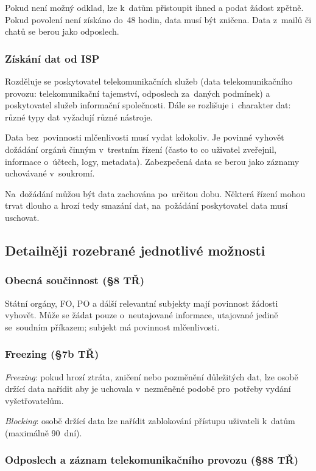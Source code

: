 Pokud není možný odklad, lze k~datům přistoupit ihned a podat žádost zpětně.
Pokud povolení není získáno do~48 hodin, data musí být zničena.
Data z~mailů či chatů se berou jako odposlech.


\subsubsection{Získání dat od ISP}

Rozděluje se poskytovatel telekomunikačních služeb (data telekomunikačního provozu: telekomunikační tajemství, odposlech za~daných podmínek) a poskytovatel služeb informační společnosti.
Dále se rozlišuje i~charakter dat: různé typy dat vyžadují různé nástroje.

Data bez~povinnosti mlčenlivosti musí vydat kdokoliv.
Je povinné vyhovět dožádání orgánů činným v~trestním řízení (často to co uživatel zveřejnil, informace o~účtech, logy, metadata).
Zabezpečená data se berou jako záznamy uchovávané v~soukromí.

Na~dožádání můžou být data zachována po~určitou dobu.
Některá řízení mohou trvat dlouho a hrozí tedy smazání dat, na~požádání poskytovatel data musí uschovat.


\subsection{Detailněji rozebrané jednotlivé možnosti}

\subsubsection{Obecná součinnost (§8 TŘ)}

Státní orgány, FO, PO a dálší relevantní subjekty mají povinnost žádosti vyhovět.
Může se žádat pouze o~neutajované informace, utajované jedině se~soudním příkazem; subjekt má povinnost mlčenlivosti.


\subsubsection{Freezing (§7b TŘ)}

\emph{Freezing}: pokud hrozí ztráta, zničení nebo pozměnění důležitých dat, lze osobě držící data nařídit aby je uchovala v~nezměněné podobě pro~potřeby vydání vyšetřovatelům.

\emph{Blocking}: osobě držící data lze nařídit zablokování přístupu uživateli k~datům (maximálně 90~dní).

\subsubsection{Odposlech a záznam telekomunikačního provozu (§88 TŘ)}

